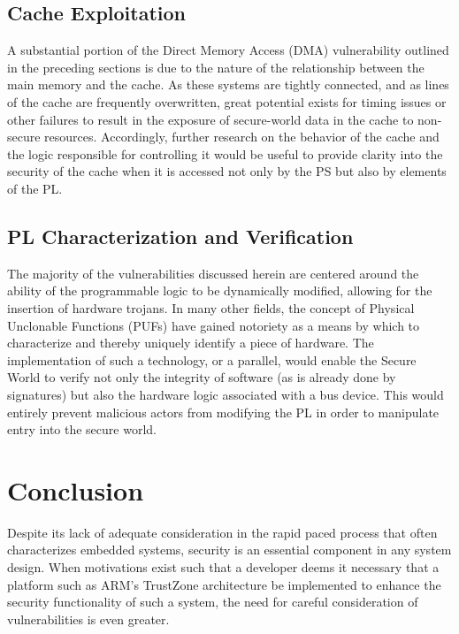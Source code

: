 \documentclass[journal]{IEEEtran}
\begin{document}
\subsection{Cache Exploitation} \label{sec:Cache Exploitation}
A substantial portion of the Direct Memory Access (DMA) vulnerability outlined in the 
preceding sections is due to the nature of the relationship between the main memory and
the cache. As these systems are tightly connected, and as lines of the cache are
frequently overwritten, great potential exists for timing issues or other failures to
result in the exposure of secure-world data in the cache to non-secure resources.
Accordingly, further research on the behavior of the cache and the logic responsible for
controlling it would be useful to provide clarity into the security of the cache when it
is accessed not only by the PS but also by elements of the PL.

\subsection{PL Characterization and Verification} \label{sec:PL Characterization}
The majority of the vulnerabilities discussed herein are centered around the ability of
the programmable logic to be dynamically modified, allowing for the insertion of hardware
trojans. In many other fields, the concept of Physical Unclonable Functions (PUFs) have
gained notoriety as a means by which to characterize and thereby uniquely identify a piece
of hardware. The implementation of such a technology, or a parallel, would enable
the Secure World to verify not only the integrity of software (as is already done by
signatures) but also the hardware logic associated with a bus device. This would entirely
prevent malicious actors from modifying the PL in order to manipulate entry into the
secure world.

\section{Conclusion} \label{sec:Conclusion}
Despite its lack of adequate consideration in the rapid paced process that often 
characterizes embedded systems, security is an essential component in any system design.
When motivations exist such that a developer deems it necessary that a platform such as
ARM's TrustZone architecture be implemented to enhance the security functionality of such
a system, the need for careful consideration of vulnerabilities is even greater.
\end{document}
